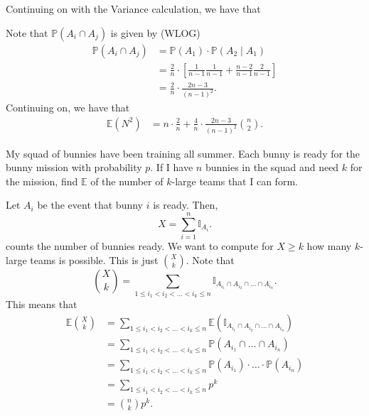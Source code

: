 
Continuing on with the Variance calculation, we have that 
\begin{tmpexplanation}
	Note that \( \mathbb{P}(A_i \cap A_j) \) is given by (WLOG)
	\begin{align*}
		\mathbb{P}(A_i \cap A_j) &= \mathbb{P}(A_1) \cdot \mathbb{P}(A_2 \mid A_1) \\
														 &= \frac{2}{n} \cdot \left[ \frac{1}{n-1} \frac{1}{n-1} + \frac{n-2}{n-1} \frac{2}{n-1} \right] \\
														 &= \frac{2}{n} \cdot \frac{2n-3}{(n-1)^{2} }
	.\end{align*}
	Continuing on, we have that
	\begin{align*}
		\mathbb{E}(N^{2} ) &= n \cdot \frac{2}{n} + \frac{4}{n}\cdot \frac{2n-3}{(n-1)^{2} } \binom{n}{2}
	.\end{align*}
\end{tmpexplanation}

\begin{eg}
	My squad of bunnies have been training all summer. Each bunny is ready for the bunny mission with probability \( p \). If I have \( n \) bunnies in the squad and need \( k \) for the mission, find \( \mathbb{E} \) of the number of \( k \)-large teams that I can form.
\end{eg}
\begin{explanation}
	Let \( A_i  \) be the event that bunny \( i \) is ready. Then, \[
		X = \sum_{i=1}^{n} \mathbb{I}_{A_i}
	.\] counts the number of bunnies ready. We want to compute for \( X \ge k \) how many \( k \)-large teams is possible. This is just \( \binom{X}{k} \). Note that \[
		\binom{X}{k} = \sum_{1 \le i_{1} < i_{2} < \ldots < i_k \le n} \mathbb{I}_{A_{i_1} \cap A_{i_2} \cap \ldots \cap A_{i_n}}
	.\] This means that 
	\begin{align*}
		\mathbb{E}\binom{X}{k} &= \sum_{1 \le i_{1} < i_{2} < \ldots < i_k \le n} \mathbb{E}\left(\mathbb{I}_{A_{i_1} \cap A_{i_2} \cap \ldots \cap A_{i_n}}\right) \\
		&= \sum_{1 \le i_{1} < i_{2} < \ldots < i_k \le n} \mathbb{P}(A_{i_1} \cap \ldots \cap A_{i_n}) \\
		&= \sum_{1 \le i_{1} < i_{2} < \ldots < i_k \le n} \mathbb{P}(A_{i_1})\cdot \ldots \cdot  \mathbb{P}(A_{i_n}) \tag{Independent}\\
		&= \sum_{1 \le i_{1} < i_{2} < \ldots < i_k \le n} p^{k} \\
		&= \binom{n}{k}p^{k}
	.\end{align*}
\end{explanation}

